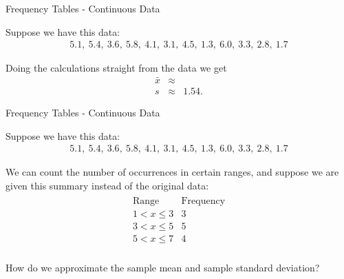 \begin{frame}{Frequency Tables - Continuous Data}

  Suppose we have this data:
  \begin{eqnarray*}
    5.1,~5.4,~3.6,~5.8,~4.1,~3.1,~4.5,~1.3,~6.0,~3.3,~2.8,~1.7
  \end{eqnarray*}

  Doing the calculations straight from the data we get
  \begin{eqnarray*}
    \bar{x} & \approx & \\ %
    s       & \approx & 1.54.
  \end{eqnarray*}

  
\end{frame}


\begin{frame}{Frequency Tables - Continuous Data}

  Suppose we have this data:
  \begin{eqnarray*}
    5.1,~5.4,~3.6,~5.8,~4.1,~3.1,~4.5,~1.3,~6.0,~3.3,~2.8,~1.7
  \end{eqnarray*}

  We can count the number of occurrences in certain ranges, and
  suppose we are given this summary instead of the original data:
    \begin{eqnarray*}
      \begin{array}{l|l}
        \mathrm{Range}   & \mathrm{Frequency} \\ \hline
        1<x\leq 3 & 3 \\
        3<x\leq 5 & 5 \\
        5<x\leq 7 & 4 \\
      \end{array}
    \end{eqnarray*}

  {
    How do we approximate the sample mean and sample standard deviation?
  }

  
\end{frame}


